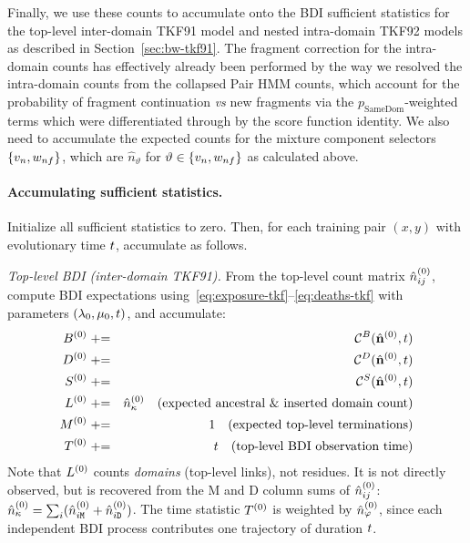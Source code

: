 Finally, we use these counts to accumulate onto the BDI sufficient statistics for the top-level inter-domain TKF91 model and nested intra-domain TKF92 models as described in Section~\ref{sec:bw-tkf91}.
The fragment correction for the intra-domain counts has effectively already been performed by the way we resolved the intra-domain counts from the collapsed Pair HMM counts, which account for the probability of fragment continuation {\em vs} new fragments via the $p_\text{SameDom}$-weighted terms which were differentiated through by the score function identity.
We also need to accumulate the expected counts for the mixture component selectors $\{ v_n, w_{nf} \}$, which are $\hat{n}_{\vartheta}$ for $\vartheta \in \{ v_n, w_{nf} \}$ as calculated above.

\paragraph{Accumulating sufficient statistics.}
Initialize all sufficient statistics to zero.
Then, for each training pair $(x, y)$ with evolutionary time $t$,
accumulate as follows.

\emph{Top-level BDI (inter-domain TKF91).}
From the top-level count matrix $\hat{n}^{(0)}_{ij}$,
compute BDI expectations using~\eqref{eq:exposure-tkf}--\eqref{eq:deaths-tkf}
with parameters $(\lambda_0,\mu_0,t)$, and accumulate:
\begin{eqnarray*}
B^{(0)} & \mathrel{+}= & \mathcal{C}^B(\hat{\bf n}^{(0)},t) \\
D^{(0)} & \mathrel{+}= & \mathcal{C}^D(\hat{\bf n}^{(0)},t) \\
S^{(0)} & \mathrel{+}= & \mathcal{C}^S(\hat{\bf n}^{(0)},t) \\
L^{(0)} & \mathrel{+}= & \hat{n}^{(0)}_{\kappa}
\quad \text{(expected ancestral \& inserted domain count)} \\
M^{(0)} & \mathrel{+}= & 1
\quad \text{(expected top-level terminations)} \\
T^{(0)} & \mathrel{+}= & t
\quad \text{(top-level BDI observation time)}
\end{eqnarray*}
Note that $L^{(0)}$ counts \emph{domains} (top-level links), not residues.
It is not directly observed, but is recovered from the M and D column sums
of $\hat{n}^{(0)}_{ij}$: $\hat{n}^{(0)}_\kappa = \sum_{i}(\hat{n}^{(0)}_{i{\tt M}} + \hat{n}^{(0)}_{i{\tt D}})$.
The time statistic $T^{(0)}$ is weighted by
$\hat{n}^{(0)}_{\varphi}$, since each independent BDI process contributes one trajectory of duration $t$.

